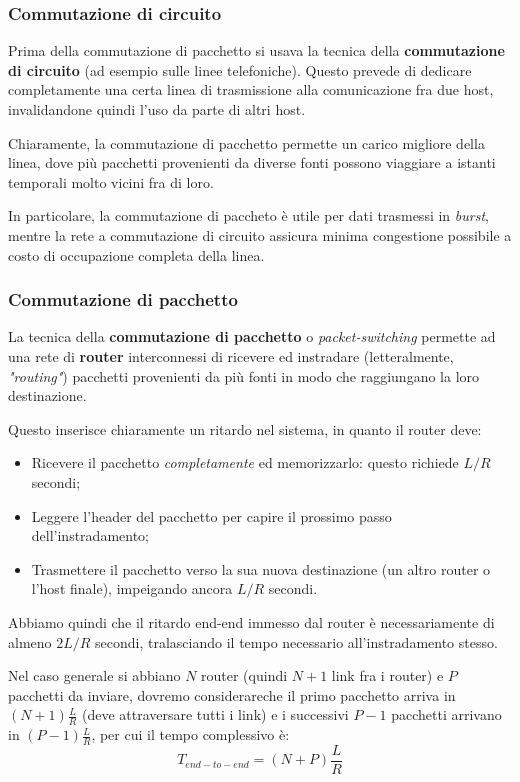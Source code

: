 \documentclass[a4paper,11pt]{article}
\begin{document}
\subsubsection{Commutazione di circuito}
Prima della commutazione di pacchetto si usava la tecnica della \textbf{commutazione di circuito} (ad esempio sulle linee telefoniche).
Questo prevede di dedicare completamente una certa linea di trasmissione alla comunicazione fra due host, invalidandone quindi l'uso da parte di altri host.

Chiaramente, la commutazione di pacchetto permette un carico migliore della linea, dove più pacchetti provenienti da diverse fonti possono viaggiare a istanti temporali molto vicini fra di loro.

In particolare, la commutazione di paccheto è utile per dati trasmessi in \textit{burst}, mentre la rete a commutazione di circuito assicura minima congestione possibile a costo di occupazione completa della linea.

\subsubsection{Commutazione di pacchetto}
La tecnica della \textbf{commutazione di pacchetto} o \textit{packet-switching} permette ad una rete di \textbf{router} interconnessi di ricevere ed instradare (letteralmente, \textit{"routing"}) pacchetti provenienti da più fonti in modo che raggiungano la loro destinazione.

Questo inserisce chiaramente un ritardo nel sistema, in quanto il router deve:
\begin{itemize}
	\item Ricevere il pacchetto \textit{completamente} ed memorizzarlo: questo richiede $L/R$ secondi;
	\item Leggere l'header del pacchetto per capire il prossimo passo dell'instradamento;
	\item Trasmettere il pacchetto verso la sua nuova destinazione (un altro router o l'host finale), impeigando ancora $L/R$ secondi.
\end{itemize}

Abbiamo quindi che il ritardo end-end immesso dal router è necessariamente di almeno $2L/R$ secondi, tralasciando il tempo necessario all'instradamento stesso. 

Nel caso generale si abbiano $N$ router (quindi $N + 1$ link fra i router) e $P$ pacchetti da inviare, dovremo considerareche il primo pacchetto arriva in $(N + 1) \frac{L}{R}$ (deve attraversare tutti i link) e i successivi $P - 1$ pacchetti arrivano in $(P - 1) \frac{L}{R}$, per cui il tempo complessivo è:
$$
T_{end-to-end} = (N + P) \frac{L}{R}
$$
\end{document}
